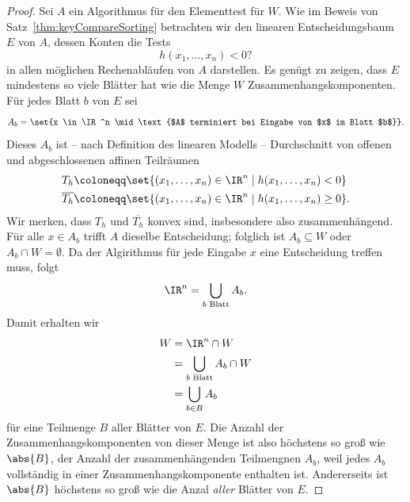 \documentclass[language=ngerman,algolist,acrolist]{TemplateLecture}
\begin{document}
\begin{proof}
    Sei $A$ ein Algorithmus für den Elementtest für $W$. Wie im Beweis von Satz~\ref{thm:keyCompareSorting} betrachten wir den linearen Entscheidungsbaum $E$ von $A$, dessen Konten die Tests 
    \begin{equation*}
        h(x_1, \ldots, x_n) < 0?
    \end{equation*}
    in allen möglichen Rechenabläufen von $A$ darstellen. Es genügt zu zeigen, dass $E$ mindestens so viele Blätter hat wie die Menge $W$ Zusammenhangskomponenten. Für jedes Blatt $b$ von $E$ sei 
    \begin{equation*}
        A_b = \set{x \in \IR^n \mid \text{$A$ terminiert bei Eingabe von $x$ im Blatt $b$}}.
    \end{equation*}
    Dieses $A_b$ ist -- nach Definition des linearen Modells -- Durchschnitt von offenen und abgeschlossenen affinen Teilräumen 
    \begin{equation*}
        \begin{split}
            T_h \coloneqq& \set{(x_1, \ldots, x_n) \in \IR^n \mid h(x_1, \ldots, x_n) < 0} \\
            \overline{T_h} \coloneqq& \set{(x_1, \ldots, x_n) \in \IR^n \mid h(x_1, \ldots, x_n) \geq 0}.
        \end{split}
    \end{equation*}
    Wir merken, dass $T_h$ und $\overline{T_h}$ konvex sind, insbesondere also zusammenhängend. Für alle $x \in A_b$ trifft $A$ dieselbe Entscheidung; folglich ist $A_b \subseteq W$ oder $A_b \cap W = \emptyset$. Da der Algirithmus für jede Eingabe $x$ eine Entscheidung treffen muss, folgt 
    \begin{equation*}
        \IR^n = \bigcup_{\text{$b$ Blatt}} A_b.
    \end{equation*}
    Damit erhalten wir 
    \begin{equation*}
        \begin{split}
            W &= \IR^n \cap W \\
            &= \bigcup_{\text{$b$ Blatt}} A_b \cap W \\
            &= \bigcup_{b \in B} A_b
        \end{split}
    \end{equation*}
    für eine Teilmenge $B$ aller Blätter von $E$. Die Anzahl der Zusammenhangskomponenten von dieser Menge ist also höchstens so groß wie $\abs{B}$, der Anzahl der zusammenhängenden Teilmengnen $A_b$, weil jedes $A_b$ vollständig in einer Zusammenhangskomponente enthalten ist. Andererseits ist $\abs{B}$ höchstens so groß wie die Anzal \emph{aller} Blätter von $E$.
\end{proof}
\end{document}
